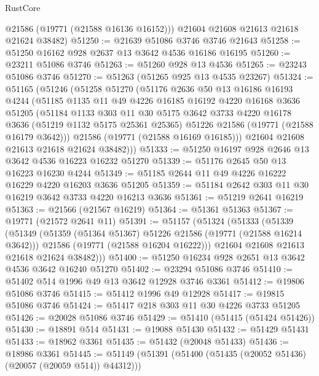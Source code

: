 \begin{lexlean}{RustCore}
\begin{coremodule}
        @21586
        (@19771 (@21588 @16136 @16152)))
      @21604
      @21608
      @21613
      @21618
      @21624
      @38482)
@51250 := @21639 @51086 @3746 @3746 @21643
@51258 := @51250 @16162 @928 @2637 @13 @3642 @4536 @16186 @16195
@51260 := @23211 @51086 @3746
@51263 := @51260 @928 @13 @4536
@51265 := @23243 @51086 @3746
@51270 := @51263 (@51265 @925 @13 @4535 @23267)
@51324 := @51165
    (@51246
      (@51258
        @51270
        (@51176
          @2636
          @50
          @13
          @16186
          @16193
          @4244
          (@51185
            @1135
            @11
            @49
            @4226
            @16185
            @16192
            @4220
            @16168
            @3636
            @51205
            (@51184
              @1133
              @303
              @11
              @30
              @5175
              @3642
              @3733
              @4220
              @16178
              @3636
              (@51219 @1132 @5175 @25361 @25365)
              @51226
              @21586
              (@19771 (@21588 @16179 @3642)))
            @21586
            (@19771 (@21588 @16169 @16185)))
          @21604
          @21608
          @21613
          @21618
          @21624
          @38482)))
@51333 := @51250 @16197 @928 @2646 @13 @3642 @4536 @16223 @16232 @51270
@51339 := @51176 @2645 @50 @13 @16223 @16230 @4244
@51349 := @51185 @2644 @11 @49 @4226 @16222 @16229 @4220 @16203 @3636 @51205
@51359 := @51184 @2642 @303 @11 @30 @16219 @3642 @3733 @4220 @16213 @3636
@51361 := @51219 @2641 @16219
@51363 := @21566 (@21567 @16219)
@51364 := @51361 @51363
@51367 := @19771 (@21572 @2641 @11)
@51391 := @51157
    (@51324
      (@51333
        (@51339
          (@51349
            (@51359 (@51364 @51367) @51226 @21586 (@19771 (@21588 @16214 @3642)))
            @21586
            (@19771 (@21588 @16204 @16222)))
          @21604
          @21608
          @21613
          @21618
          @21624
          @38482)))
@51400 := @51250 @16234 @928 @2651 @13 @3642 @4536 @3642 @16240 @51270
@51402 := @23294 @51086 @3746
@51410 := @51402 @514 @1996 @49 @13 @3642 @12928 @3746 @3361
@51412 := @19806 @51086 @3746
@51415 := @51412 @1996 @49 @12928
@51417 := @19815 @51086 @3746
@51424 := @51417 @218 @303 @11 @30 @4226 @3733 @51205
@51426 := @20028 @51086 @3746
@51429 := @51410 (@51415 (@51424 @51426))
@51430 := @18891 @514
@51431 := @19088 @51430
@51432 := @51429 @51431
@51433 := @18962 @3361
@51435 := @51432 (@20048 @51433)
@51436 := @18986 @3361
@51445 := @51149 (@51391 (@51400 (@51435 (@20052 @51436) (@20057 (@20059 @514)) @44312)))

\end{coremodule}
\end{lexlean}
